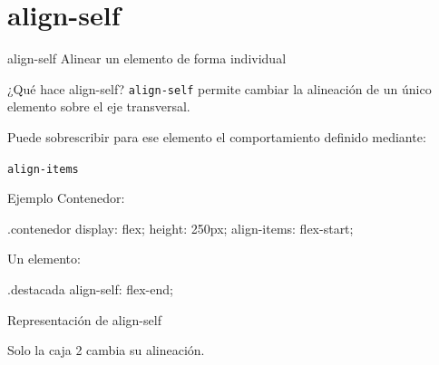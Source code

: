 \documentclass[aspectratio=169,11.5pt]{beamer}
\begin{document}

    \section{align-self}

    \SectionSlide
    {align-self}
    {Alinear un elemento de forma individual}

    \begin{frame}{¿Qué hace align-self?}
        \texttt{align-self} permite cambiar
        la alineación de un único elemento
        sobre el eje transversal.

        Puede sobrescribir para ese elemento
        el comportamiento definido mediante:

        \begin{center}
            \texttt{align-items}
        \end{center}
    \end{frame}

    \begin{frame}[fragile]{Ejemplo}
        Contenedor:

        \begin{csscodedark}
            .contenedor {
                display: flex;
                height: 250px;
                align-items: flex-start;
            }
        \end{csscodedark}

        Un elemento:

        \begin{csscodedark}
            .destacada {
                align-self: flex-end;
            }
        \end{csscodedark}
    \end{frame}

    \begin{frame}{Representación de align-self}
        \begin{center}
        \end{center}

        Solo la caja 2 cambia su alineación.
    \end{frame}
\end{document}
